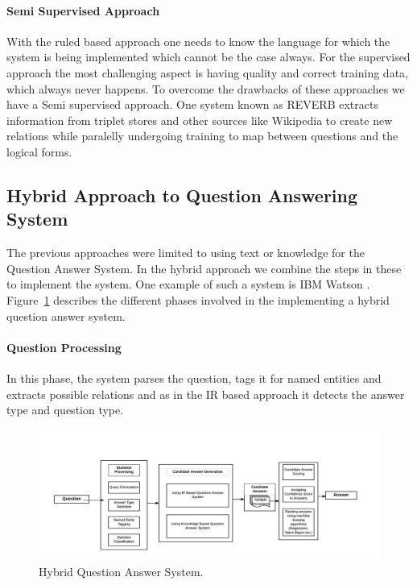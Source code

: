  \paragraph{Semi Supervised Approach}
With the ruled based approach one needs to know the language for which the system is being implemented which cannot be the case always. For the supervised approach the most challenging aspect is having quality and correct training data, which always never happens. To overcome the drawbacks of these approaches we have a Semi supervised approach. One system known as REVERB extracts information from triplet stores and other sources like Wikipedia to create new relations while paralelly undergoing training to map between questions and the logical forms.

\subsection{Hybrid Approach to Question Answering System}
The previous approaches were limited to using text or knowledge for the Question Answer System. In the hybrid approach we combine the steps in these to implement the system. One example of such a system is IBM Watson \cite {high2012era}. Figure~\ref{fig:Hybrid_QA} describes the different phases involved in the implementing a hybrid question answer system. 

\paragraph{Question Processing}
In this phase, the system parses the question, tags it for named entities and extracts possible relations and as in the IR based approach it detects the answer type and question type.

\begin{figure}[htb]
\centering
\includegraphics[scale=0.8]{images/Hybrid_QA.jpg}
\caption{Hybrid Question Answer System.} 
\label{fig:Hybrid_QA}
\end{figure}

